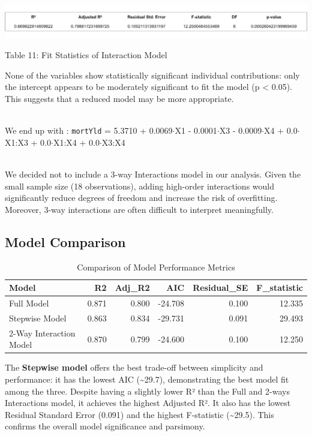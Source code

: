 \documentclass[
  11pt,
]{article}
\begin{document}
\noindent
\includegraphics[width=1\linewidth]{interaction_model_fitstats.png}

\par

\small Table 11: Fit Statistics of Interaction Model

\addtocounter{table}{2}

\hfill\break
None of the variables show statistically significant individual
contributions: only the intercept appears to be moderately significant
to fit the model (p \textless{} 0.05). This suggests that a reduced
model may be more appropriate.\\
\strut \\
We end up with : \texttt{mortYld} = 5.3710 + 0.0069\(\cdot\)X1 -
0.0001\(\cdot\)X3 - 0.0009\(\cdot\)X4 + 0.0\(\cdot\)X1:X3 +
0.0\(\cdot\)X1:X4 + 0.0\(\cdot\)X3:X4\\
\strut \\
We decided not to include a 3-way Interactions model in our analysis.
Given the small sample size (18 observations), adding high-order
interactions would significantly reduce degrees of freedom and increase
the risk of overfitting. Moreover, 3-way interactions are often
difficult to interpret meaningfully.

\subsection{Model Comparison}\label{model-comparison}

\begingroup\fontsize{8}{10}\selectfont

\begin{longtable}[t]{lrrrrr}
\caption{\label{tab:unnamed-chunk-11}Comparison of Model Performance Metrics}\\
\toprule
Model & R2 & Adj\_R2 & AIC & Residual\_SE & F\_statistic\\
\midrule
Full Model & 0.871 & 0.800 & -24.708 & 0.100 & 12.335\\
Stepwise Model & 0.863 & 0.834 & -29.731 & 0.091 & 29.493\\
2-Way Interaction Model & 0.870 & 0.799 & -24.600 & 0.100 & 12.250\\
\bottomrule
\end{longtable}
\endgroup{}

The \textbf{Stepwise model} offers the best trade-off between simplicity
and performance: it has the lowest AIC (\textasciitilde29.7),
demonstrating the best model fit among the three. Despite having a
slightly lower R² than the Full and 2-ways Interactions model, it
achieves the highest Adjusted R². It also has the lowest Residual
Standard Error (0.091) and the highest F-statistic
(\textasciitilde29.5). This confirms the overall model significance and
parsimony.
\end{document}
